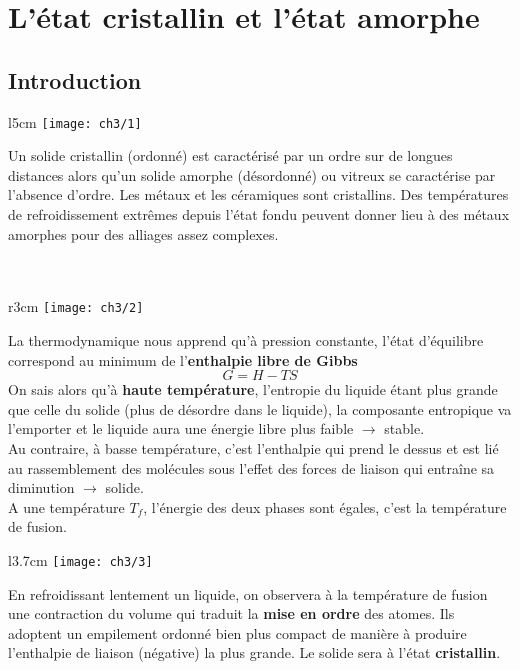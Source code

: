 
\chapter{L'état cristallin et l'état amorphe}
\section{Introduction}
	\begin{wrapfigure}[6]{l}{5cm}
	\vspace{-6mm}
	\texttt{[image: ch3/1]}
	\end{wrapfigure}
	Un solide cristallin (ordonné) est caractérisé par un ordre sur de longues distances alors qu'un solide amorphe (désordonné) ou vitreux se caractérise par l'absence d'ordre. Les métaux et les céramiques sont cristallins. Des températures de refroidissement extrêmes depuis l'état fondu peuvent donner lieu à des métaux amorphes pour des alliages assez complexes.\\\\\\
	
	\begin{wrapfigure}[6]{r}{3cm}
	\vspace{-10mm}
	\texttt{[image: ch3/2]}
	\end{wrapfigure}
	La thermodynamique nous apprend qu'à pression constante, l'état d'équilibre correspond au minimum de l'\textbf{enthalpie libre de Gibbs}
	\begin{equation}
		G = H-TS
	\end{equation}
	On sais alors qu'à \textbf{haute température}, l'entropie du liquide étant plus grande que celle du solide (plus de désordre dans le liquide), la composante entropique va l'emporter et le liquide aura une énergie libre plus faible $\rightarrow$ stable.\\
	Au contraire, à basse température, c'est l'enthalpie qui prend le dessus et est lié au rassemblement des molécules sous l'effet des forces de liaison qui entraîne sa diminution $\rightarrow$ solide.\\
	 A une température $T_f$, l'énergie des deux phases sont égales, c'est la température de fusion. 
	 
	\begin{wrapfigure}[7]{l}{3.7cm}
	\vspace{-5mm}
	\texttt{[image: ch3/3]}
	\end{wrapfigure}
	En refroidissant lentement un liquide, on observera à la température de fusion une contraction du volume qui traduit la \textbf{mise en ordre} des atomes. Ils adoptent un empilement ordonné bien plus compact de manière à produire l'enthalpie de liaison (négative) la plus grande. Le solide sera à l'état \textbf{cristallin}.\\
	
